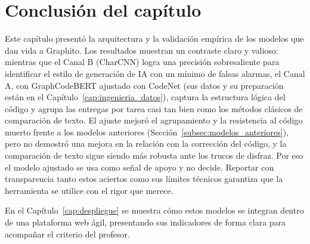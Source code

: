 \section{Conclusión del capítulo}
\label{sec:conclusion_modelado}

Este capítulo presentó la arquitectura y la validación empírica de los modelos que dan vida a Graphito. Los resultados muestran un contraste claro y valioso: mientras que el Canal B (CharCNN) logra una precisión sobresaliente para identificar el estilo de generación de IA con un mínimo de falsas alarmas, el Canal A, con GraphCodeBERT ajustado con CodeNet (sus datos y su preparación están en el Capítulo~\ref{cap:ingenieria_datos}), captura la estructura lógica del código y agrupa las entregas por tarea casi tan bien como los métodos clásicos de comparación de texto. El ajuste mejoró el agrupamiento y la resistencia al código muerto frente a los modelos anteriores (Sección~\ref{subsec:modelos_anteriores}), pero no demostró una mejora en la relación con la corrección del código, y la comparación de texto sigue siendo más robusta ante los trucos de disfraz. Por eso el modelo ajustado se usa como señal de apoyo y no decide. Reportar con transparencia tanto estos aciertos como sus límites técnicos garantiza que la herramienta se utilice con el rigor que merece.

En el Capítulo~\ref{cap:despliegue} se muestra cómo estos modelos se integran dentro de una plataforma web ágil, presentando sus indicadores de forma clara para acompañar el criterio del profesor.